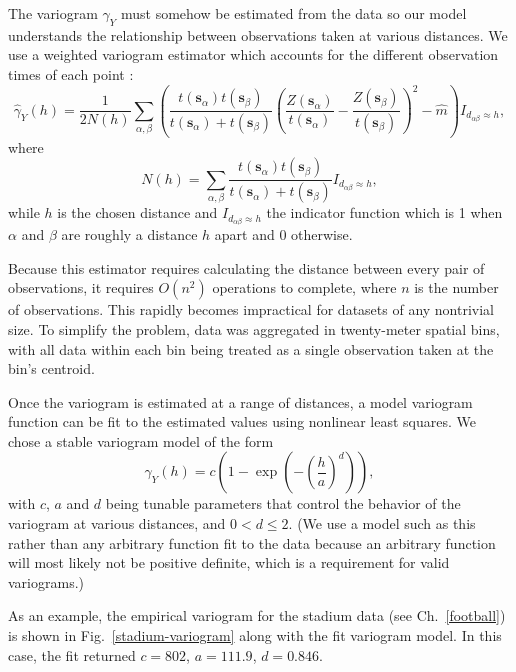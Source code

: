 The variogram \(\gamma_Y\) must somehow be estimated from the data so our model
understands the relationship between observations taken at various distances. We
use a weighted variogram estimator which accounts for the different observation
times of each point \cite{Monestiez:2006jp}:
\begin{equation}
  \hat \gamma_Y (h) = \frac{1}{2N(h)} \sum_{\alpha, \beta} \left(
    \frac{t(\mathbf{s}_\alpha) t(\mathbf{s}_\beta)}{t(\mathbf{s}_\alpha) +
      t(\mathbf{s}_\beta)} \left(
      \frac{Z(\mathbf{s}_\alpha)}{t(\mathbf{s}_\alpha)} -
      \frac{Z(\mathbf{s}_\beta)}{t(\mathbf{s}_\beta)} \right)^2 - \hat m \right)
  I_{d_{\alpha \beta} \approx h},
\end{equation}
where
\begin{equation}
N(h) = \sum_{\alpha, \beta}  \frac{t(\mathbf{s}_\alpha) t(\mathbf{s}_\beta)}{t(\mathbf{s}_\alpha) +
      t(\mathbf{s}_\beta)} I_{d_{\alpha \beta} \approx h},
\end{equation}
while \(h\) is the chosen distance and \(I_{d_{\alpha \beta} \approx h}\) the
indicator function which is 1 when \(\alpha\) and \(\beta\) are roughly a
distance \(h\) apart and 0 otherwise.

Because this estimator requires calculating the distance between every pair of
observations, it requires \(O(n^2)\) operations to complete, where \(n\) is the
number of observations. This rapidly becomes impractical for datasets of any
nontrivial size. To simplify the problem, data was aggregated in twenty-meter
spatial bins, with all data within each bin being treated as a single
observation taken at the bin's centroid.

Once the variogram is estimated at a range of distances, a model variogram
function can be fit to the estimated values using nonlinear least squares. We
chose a stable variogram model of the form
\begin{equation}\label{var-model}
  \gamma_Y(h) = c\left(1 - \exp \left(- \left(\frac{h}{a}\right)^d \right)\right),
\end{equation}
with \(c\), \(a\) and \(d\) being tunable parameters that control the behavior
of the variogram at various distances, and \(0 < d \leq 2\).\cite{Chiles} (We
use a model such as this rather than any arbitrary function fit to the data
because an arbitrary function will most likely not be positive definite, which
is a requirement for valid variograms.)

As an example, the empirical variogram for the stadium data (see
Ch.~\ref{football}) is shown in Fig.~\ref{stadium-variogram} along with the fit
variogram model. In this case, the fit returned \(c=802\), \(a=111.9\),
\(d=0.846\).


